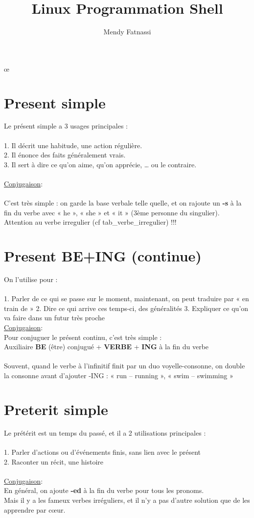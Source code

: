 œ\documentclass[a4paper,12pt,openany]{book}
\author{Mendy Fatnassi}
\title{Linux Programmation Shell}
\begin{document}
\chapter{Present simple}

Le présent simple a 3 usages principales :\\
\\
    1. Il décrit une habitude, une action régulière.\\
    2. Il énonce des faits généralement vrais.\\
    3. Il sert à dire ce qu’on aime, qu’on apprécie, … ou le contraire.\\
\\
\underline{Conjugaison}: \\
\\
C’est très simple : on garde la base verbale telle quelle, et on rajoute un \textbf{-s} à la fin du verbe avec « he », « she » et « it » (3ème personne du singulier).\\
Attention au verbe irregulier (cf tab_verbe_irregulier) !!!\\

\chapter{Present BE+ING (continue)}

On l’utilise pour :\\
\\
	1. Parler de ce qui se passe sur le moment, maintenant, on peut traduire par « en train de »
	2. Dire ce qui arrive ces temps-ci, des généralités
	3. Expliquer ce qu’on va faire dans un futur très proche
\\
\underline{Conjugaison}:\\
Pour conjuguer le présent continu, c’est très simple :\\
Auxiliaire \textbf{BE} (être) conjugué + \textbf{VERBE} + \textbf{ING} à la fin du verbe\\
\\
Souvent, quand le verbe à l’infinitif finit par un duo voyelle-consonne, on double la consonne avant d’ajouter -ING : « run – running », « swim – swimming »\\

\chapter{Preterit simple}

Le prétérit est un temps du passé, et il a 2 utilisations principales :\\
\\
    1. Parler d’actions ou d’événements finis, sans lien avec le présent\\
    2. Raconter un récit, une histoire\\
\\
\underline{Conjugaison}:\\
En général, on ajoute \textbf{-ed} à la fin du verbe pour tous les pronoms.\\
Mais il y a les fameux verbes irréguliers, et il n’y a pas d’autre solution que de les apprendre par cœur.\\
\end{document}
